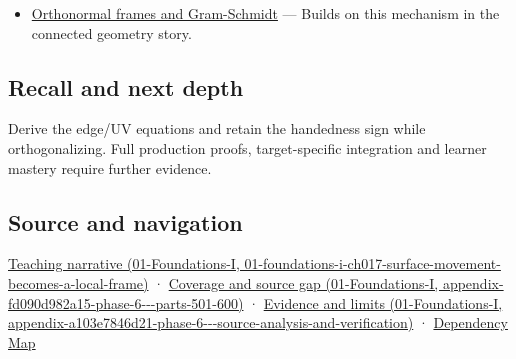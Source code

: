 \begin{itemize}
\tightlist
\item
  \hyperref[appendix-c39f1ed34271]{Orthonormal frames and Gram-Schmidt} --- Builds on this mechanism in the connected geometry story.
\end{itemize}

\subsection{Recall and next depth}\label{appendix-e31893dec985-recall-and-next-depth}

Derive the edge/UV equations and retain the handedness sign while orthogonalizing. Full production proofs, target-specific integration and learner mastery require further evidence.

\subsection{Source and navigation}\label{appendix-e31893dec985-source-and-navigation}

\href{../01-Foundations-I/main.pdf\#nameddest=01-foundations-i-ch017-surface-movement-becomes-a-local-frame}{Teaching narrative (01-Foundations-I, 01-foundations-i-ch017-surface-movement-becomes-a-local-frame)} · \href{../01-Foundations-I/main.pdf\#nameddest=appendix-fd090d982a15-phase-6---parts-501-600}{Coverage and source gap (01-Foundations-I, appendix-fd090d982a15-phase-6-\/-\/-parts-501-600)} · \href{../01-Foundations-I/main.pdf\#nameddest=appendix-a103e7846d21-phase-6---source-analysis-and-verification}{Evidence and limits (01-Foundations-I, appendix-a103e7846d21-phase-6-\/-\/-source-analysis-and-verification)} · \hyperref[appendix-4ad47bdd269a]{Dependency Map}
